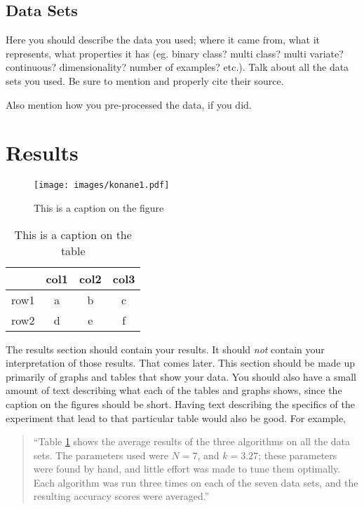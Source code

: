 \documentclass[12pt, letterpaper]{article}
\begin{document}
\subsection*{Data Sets}
Here you should describe the data you used; where it came from, what it
represents, what properties it has (eg. binary class? multi class? multi
variate? continuous? dimensionality? number of examples? etc.).  Talk about all
the data sets you used.  Be sure to mention and properly cite their source.

Also mention how you pre-processed the data, if you did.


\section{Results}
\begin{figure}
\begin{center}
\texttt{[image: images/konane1.pdf]}
\end{center}
\caption{This is a caption on the figure}
\label{somefigure}
\end{figure}

\begin{table}
\begin{center}
\begin{tabular}{|c||c|cc}
\hline
& col1 & col2 & col3\\
\hline \hline
row1 & a & b & c\\
\hline 
row2 & d & e & f\\
\hline 
\end{tabular}
\end{center}
\caption{This is a caption on the table}
\label{sometable}
\end{table}

The results section should contain your results.  It should \emph{not} contain
your interpretation of those results.  That comes later.  This section should be
made up primarily of graphs and tables that show your data.  You should also
have a small amount of text describing what each of the tables and graphs shows,
since the caption on the figures should be short.  Having text describing the
specifics of the experiment that lead to that particular table would also be
good.  For example,

\begin{quote}
``Table \ref{sometable} shows the average results of the three algorithms on all
the data sets.  The parameters used were $N=7$, and $k=3.27$; these parameters
were found by hand, and little effort was made to tune them optimally.  Each
algorithm was run three times on each of the seven data sets, and the resulting
accuracy scores were averaged.''
\end{quote}
\end{document}
